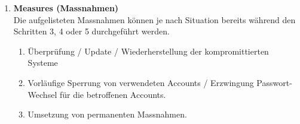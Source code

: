 \begin{enumerate}[font=\bfseries]
\item \textbf{Measures (Massnahmen)}\\
Die aufgelisteten Massnahmen können je nach Situation bereits während den Schritten 3, 4 oder 5 durchgeführt werden.
\begin{enumerate}
\item Überprüfung / Update / Wiederherstellung der kompromittierten Systeme
\item Vorläufige Sperrung von verwendeten Accounts / Erzwingung Passwort-Wechsel für die betroffenen Accounts.
\item Umsetzung von permanenten Massnahmen.
\end{enumerate}
\end{enumerate}